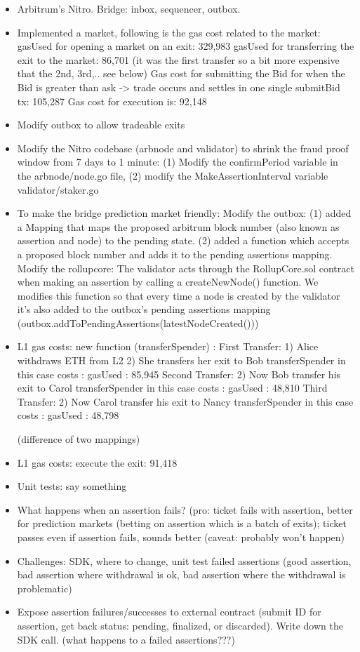 \begin{itemize}
\item Arbitrum's Nitro. Bridge: inbox, sequencer, outbox.
\item Implemented a market, following is the gas cost related to the market:
gasUsed for opening a market on an exit: 329,983
gasUsed for transferring the exit to the market:  86,701 (it was the first transfer so a bit more expensive that the 2nd, 3rd,.. see below)
Gas cost for submitting the Bid for when the Bid is greater than ask -> trade occurs and settles in one single submitBid tx:  105,287
Gas cost for execution is: 92,148
\item Modify outbox to allow tradeable exits
\item Modify the Nitro codebase (arbnode and validator) to shrink the fraud proof window from 7 days to 1 minute: (1) Modify the confirmPeriod variable in the arbnode/node.go file, (2) modify the MakeAssertionInterval variable validator/staker.go
\item To make the bridge prediction market friendly: 
Modify the outbox: (1) added a Mapping that maps the proposed arbitrum block number (also known as assertion and node) to the pending state. (2) added a function which accepts a proposed block number and adds it to the pending assertions mapping.
Modify the rollupcore: The validator acts through the RollupCore.sol contract when making an assertion by calling a createNewNode() function. We modifies this function so that every time a node is created by the validator it's also added to the outbox's pending assertions mapping (outbox.addToPendingAssertions(latestNodeCreated()))

\item L1 gas costs: new function (transferSpender) : 
First Transfer: 
1) Alice withdraws ETH from L2
2) She transfers her exit to Bob
transferSpender in this case costs : gasUsed : 85,945
Second Transfer: 
2) Now Bob transfer his exit to Carol
transferSpender in this case costs : gasUsed : 48,810
Third Transfer:
2) Now Carol transfer his exit to Nancy
transferSpender in this case costs : gasUsed : 48,798

 (difference of two mappings)

\item L1 gas costs: execute the exit: 91,418

\item Unit tests: say something
\item What happens when an assertion fails? (pro: ticket fails with assertion, better for prediction markets (betting on assertion which is a batch of exits); ticket passes even if assertion fails, sounds better (caveat: probably won't happen)
\item Challenges: SDK, where to change, unit test failed assertions (good assertion, bad assertion where withdrawal is ok, bad assertion where the withdrawal is problematic)
\item Expose assertion failures/successes to external contract (submit ID for assertion, get back status: pending, finalized, or discarded). Write down the SDK call. (what happens to a failed assertions???)
\end{itemize}


